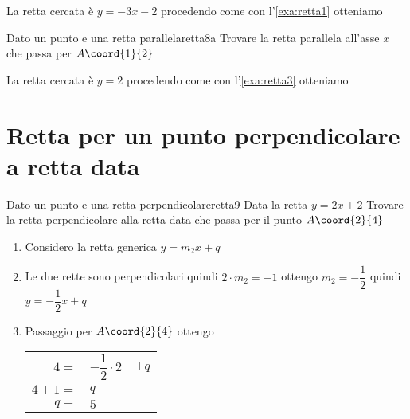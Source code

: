 La retta cercata è $y=-3x-2$ procedendo come con l'\cref{exa:retta1}
otteniamo
\begin{center}
	
	\label{fig:disegnoretta8}
\end{center}
\begin{esempiot}{Dato un punto e una retta parallela}{retta8a}
	Trovare la retta parallela all'asse $x$ che passa per $A\coord{1}{2}$
\end{esempiot}
La retta cercata è $y=2$ procedendo come con l'\cref{exa:retta3}
otteniamo
\begin{center}
	
	\label{fig:disegnoretta8a}
\end{center}
\section{Retta per un punto perpendicolare a retta data}
\begin{esempiot}{Dato un punto e una retta perpendicolare}{retta9}
	Data la retta $y=2x+2$ Trovare la retta perpendicolare alla retta data che  passa per il punto	$A\coord{2}{4}$
\end{esempiot}
\begin{enumerate}
	\item Considero la retta generica $y=m_2x+q$
	\item Le due rette sono perpendicolari quindi $2\cdot m_2=-1$ ottengo $m_2=-\dfrac{1}{2}$ quindi $y=-\dfrac{1}{2}x+q$
	\item Passaggio per $A\coord{2}{4}$ ottengo 
	\begin{tabular}{rll}
		$4=$&$-\dfrac{1}{2}\cdot 2$&$+q$\\
		$4+1=$&$q$\\
		$q=$&$5$\\
	\end{tabular}
\end{enumerate}

